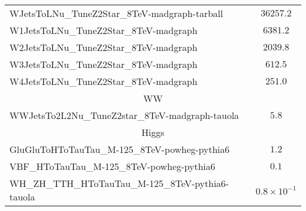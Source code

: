 \begin{table}[!Hhtb]
\begin{center}
{\begin{tabular}{|l|c|}
WJetsToLNu\_TuneZ2Star\_8TeV-madgraph-tarball          &  $36257.2$              \\
W1JetsToLNu\_TuneZ2Star\_8TeV-madgraph         &  $6381.2$               \\
W2JetsToLNu\_TuneZ2Star\_8TeV-madgraph         &  $2039.8$               \\
W3JetsToLNu\_TuneZ2Star\_8TeV-madgraph         &  $612.5$               \\
W4JetsToLNu\_TuneZ2Star\_8TeV-madgraph         &  $251.0$                \\
\hline\hline
\multicolumn{2}{|c|}{WW}\\
\hline\hline
WWJetsTo2L2Nu\_TuneZ2star\_8TeV-madgraph-tauola        &  $5.8$                \\

\hline\hline
\multicolumn{2}{|c|}{Higgs}\\
\hline\hline
GluGluToHToTauTau\_M-125\_8TeV-powheg-pythia6          &  $1.2$                \\
VBF\_HToTauTau\_M-125\_8TeV-powheg-pythia6             &  $0.1$                \\
WH\_ZH\_TTH\_HToTauTau\_M-125\_8TeV-pythia6-tauola     &  $0.8\times10^{-1}$                \\
\hline
\hline
\end{tabular}
\label{Tab.MCSamples}
}
\end{center}
\end{table}

